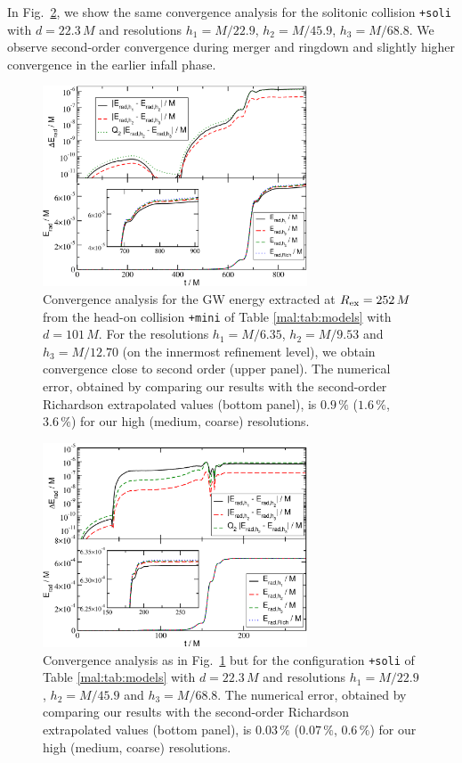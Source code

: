 In Fig.~\ref{mal:fig:conv_tsBS_Erad}, we show the same
convergence analysis for the solitonic collision
{\tt +soli} with $d=22.3\,M$ and resolutions
$h_1=M/22.9$, $h_2=M/45.9$, $h_3=M/68.8$. We observe
second-order convergence during merger and ringdown and
slightly higher convergence in the earlier infall phase.
%
\begin{figure}[t]
    \centering
    \includegraphics[width=0.7\textwidth]{malaise_source/conv_tmBS_Erad.pdf}
    \caption{
    Convergence analysis for the GW energy extracted at
    $R_{\rm ex}=252\,M$ from the head-on collision
    {\tt +mini} of Table \ref{mal:tab:models} with
    $d=101\,M$. For the resolutions
    $h_1=M/6.35$, $h_2=M/9.53$ and $h_3=M/12.70$
    (on the innermost refinement level),
    we obtain convergence close to second order
    (upper panel). The numerical error,
    obtained by comparing our results
    with the second-order Richardson extrapolated values
    (bottom panel), is $0.9\,\%$ ($1.6\,\%$, $3.6\,\%$) for
    our high (medium, coarse) resolutions.
    }
    \label{mal:fig:conv_tmBS_Erad}
\end{figure}
%
%
\begin{figure}[t]
    \centering
    \includegraphics[width=0.7\textwidth]{malaise_source/conv_tsBS_Erad.pdf}
    \caption{Convergence analysis as in
    Fig.~\ref{mal:fig:conv_tmBS_Erad} but for the configuration
    {\tt +soli} of Table \ref{mal:tab:models} with
    $d=22.3\,M$ and
    resolutions $h_1=M/22.9$, $h_2=M/45.9$ and $h_3=M/68.8$.
    The numerical error,
    obtained by comparing our results
    with the second-order Richardson extrapolated values
    (bottom panel),
    is $0.03\,\%$ ($0.07\,\%$, $0.6\,\%$) for
    our high (medium, coarse) resolutions.
    }
    \label{mal:fig:conv_tsBS_Erad}
\end{figure}
